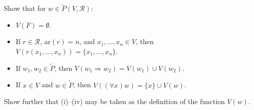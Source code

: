 Show that for $w \in \tilde{P}(V, \mathcal{R})$:
\begin{itemize}
\item[(i)] $V(F) = \emptyset$.
\item[(ii)] If $r \in \mathcal{R}$, $\text{ar}(r) = n$, and $x_1, \ldots, x_n \in V$, then $V(r(x_1, \ldots, x_n)) = \{x_1, \ldots, x_n\}$.
\item[(iii)] If $w_1, w_2 \in \tilde{P}$, then $V(w_1 \Rightarrow w_2) = V(w_1) \cup V(w_2)$.
\item[(iv)] If $x \in V$ and $w \in \tilde{P}$, then $V((\forall x)w) = \{x\} \cup V(w)$.
\end{itemize}
Show further that (i)--(iv) may be taken as the definition of the function $V(w)$.
